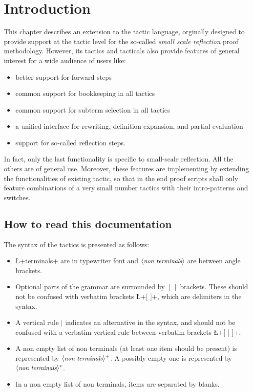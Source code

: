 \section{Introduction}\label{sec:intro}

This chapter describes an extension to the \Coq{} tactic language,
orginally designed to provide support at the tactic level for the
so-called \emph{small scale reflection} proof methodology.
 However, its tactics and tacticals
also provide features of general interest for a wide audience of users
like:
\begin{itemize}
\item better support for forward steps
\item common support for bookkeeping in all tactics
\item common support for subterm selection in all tactics
\item a unified interface for rewriting, definition expansion, and
  partial evaluation
\item support for so-called reflection steps.
\end{itemize}


In fact, only the last functionality is specific to small-scale
reflection. All the others are of general use. Moreover, these
features are implementing by extending the functionalities of existing
tactic, so that in the end proof scripts shall only feature
combinations of a very small number tactics with their intro-patterns
and switches.

\subsection*{How to read this documentation}


The syntax of the tactics is presented as follows:
\begin{itemize}
\item \L+terminals+ are in typewriter font and $\langle\mbox{\itshape\rmfamily\small non terminals}\rangle$ are
  between angle brackets.
\item Optional parts of the grammar are surrounded by $[\ ]$
  brackets. These should not be confused with verbatim brackets
  \L+[ ]+, which are delimiters in the \ssr{} syntax.
\item A vertical rule $|$ indicates an alternative in the syntax, and
  should not be confused with a
  verbatim vertical rule between verbatim brackets \L+[ | ]+.
\item A non empty list of non terminals (at least one item should be
  present) is represented by $\langle\mbox{\itshape\rmfamily\small non terminals}\rangle^+$. A possibly empty
  one is represented by $\langle\mbox{\itshape\rmfamily\small non terminals}\rangle^*$.
\item In a non empty list of non terminals, items are separated by blanks.
\end{itemize}


